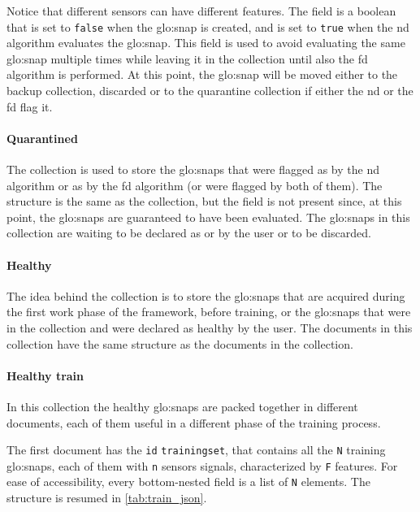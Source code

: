 Notice that different sensors can have different features. The  field is a boolean that is set to \texttt{false} when the \gls{glo:snap} is created, and is set to \texttt{true} when the \gls{nd} algorithm evaluates the \gls{glo:snap}. This field is used to avoid evaluating the same \gls{glo:snap} multiple times while leaving it in the collection until also the \gls{fd} algorithm is performed. At this point, the \gls{glo:snap} will be moved either to the backup collection, discarded or to the quarantine collection if either the \gls{nd} or the \gls{fd} flag it.

\paragraph{Quarantined}
The  collection is used to store the \gls{glo:snap}s that were flagged as  by the \gls{nd} algorithm or as  by the \gls{fd} algorithm (or were flagged by both of them). The structure is the same as the  collection, but the  field is not present since, at this point, the \gls{glo:snap}s are guaranteed to have been evaluated. The \gls{glo:snap}s in this collection are waiting to be declared as  or  by the user or to be discarded.

\paragraph{Healthy}
The idea behind the  collection is to store the \gls{glo:snap}s that are acquired during the first work phase of the framework, before training, or the \gls{glo:snap}s that were in the  collection and were declared as healthy by the user. The documents in this collection have the same structure as the documents in the  collection.

\paragraph{Healthy train}
In this collection the healthy \gls{glo:snap}s are packed together in different documents, each of them useful in a different phase of the training process.

{The first document has the \texttt{id} \texttt{training\textunderscore set}, that contains all the \texttt{N} training \gls{glo:snap}s, each of them with \texttt{n} sensors signals, characterized by \texttt{F} features. For ease of accessibility, every bottom-nested field is a list of \texttt{N} elements. The structure is resumed in \autoref{tab:train_json}.}


